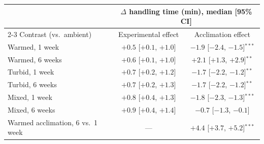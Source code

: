 \begin{tabular}{lcc}
\toprule
 & \multicolumn{2}{c}{$\Delta$ handling time (min), median [95\% CI]} \\
\cmidrule(l){2-3}
Contrast (vs.\ ambient) & Experimental effect & Acclimation effect \\
\midrule
Warmed, 1 week & $+0.5$ [$+0.1$, $+1.0$] & $-1.9$ [$-2.4$, $-1.5$]$^{***}$ \\
Warmed, 6 weeks & $+0.6$ [$+0.1$, $+1.0$] & $+2.1$ [$+1.3$, $+2.9$]$^{**}$ \\
Turbid, 1 week & $+0.7$ [$+0.2$, $+1.2$] & $-1.7$ [$-2.2$, $-1.2$]$^{**}$ \\
Turbid, 6 weeks & $+0.7$ [$+0.2$, $+1.3$] & $-1.7$ [$-2.2$, $-1.2$]$^{**}$ \\
Mixed, 1 week & $+0.8$ [$+0.4$, $+1.3$] & $-1.8$ [$-2.3$, $-1.3$]$^{***}$ \\
Mixed, 6 weeks & $+0.9$ [$+0.4$, $+1.4$] & $-0.7$ [$-1.3$, $-0.1$] \\
\midrule
Warmed acclimation, 6 vs.\ 1 week & --- & $+4.4$ [$+3.7$, $+5.2$]$^{***}$ \\
\bottomrule
\end{tabular}
